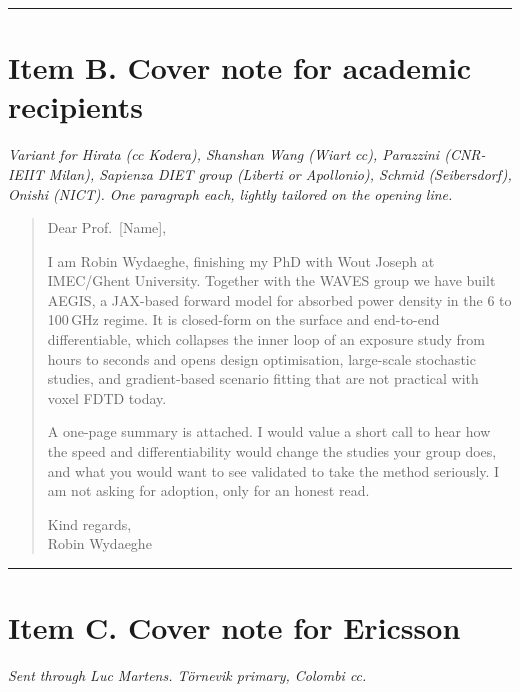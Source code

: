 \documentclass[11pt,a4paper]{article}
\begin{document}
\vspace{0.6em}
\hrule
\vspace{0.6em}

\section*{Item B. Cover note for academic recipients}
\emph{Variant for Hirata (cc Kodera), Shanshan Wang (Wiart cc), Parazzini (CNR-IEIIT Milan), Sapienza DIET group (Liberti or Apollonio), Schmid (Seibersdorf), Onishi (NICT). One paragraph each, lightly tailored on the opening line.}

\begin{quote}
Dear Prof.\ [Name],

I am Robin Wydaeghe, finishing my PhD with Wout Joseph at IMEC/Ghent University. Together with the WAVES group we have built AEGIS, a JAX-based forward model for absorbed power density in the 6 to 100\,GHz regime. It is closed-form on the surface and end-to-end differentiable, which collapses the inner loop of an exposure study from hours to seconds and opens design optimisation, large-scale stochastic studies, and gradient-based scenario fitting that are not practical with voxel FDTD today.

A one-page summary is attached. I would value a short call to hear how the speed and differentiability would change the studies your group does, and what you would want to see validated to take the method seriously. I am not asking for adoption, only for an honest read.

Kind regards,\\
Robin Wydaeghe
\end{quote}

\vspace{0.6em}
\hrule
\vspace{0.6em}

\section*{Item C. Cover note for Ericsson}
\emph{Sent through Luc Martens. T\"ornevik primary, Colombi cc.}
\end{document}
